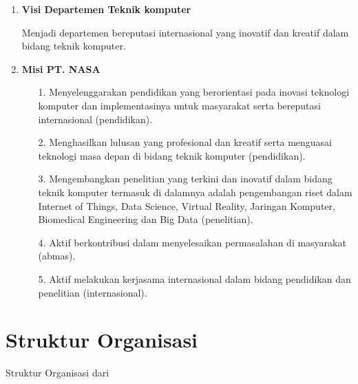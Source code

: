 \begin{enumerate}[nolistsep]

  \item \textbf{Visi Departemen Teknik komputer}

	Menjadi departemen bereputasi internasional yang inovatif dan kreatif dalam bidang teknik komputer.

  \item \textbf{Misi PT. NASA}

  \begin{enumerate}[nolistsep]

    \item [1. ] Menyelenggarakan pendidikan yang berorientasi pada inovasi teknologi komputer dan implementasinya untuk masyarakat serta bereputasi internasional (pendidikan).

    \item [2. ] Menghasilkan lulusan yang profesional dan kreatif serta menguasai teknologi masa depan di bidang teknik komputer (pendidikan).

    \item [3. ] Mengembangkan penelitian yang terkini dan inovatif dalam bidang teknik komputer termasuk di dalamnya adalah pengembangan riset dalam Internet of Things, Data Science, Virtual Reality, Jaringan Komputer, Biomedical Engineering dan Big Data (penelitian).

    \item [4. ] Aktif berkontribusi dalam menyelesaikan permasalahan di masyarakat (abmas).

    \item [5. ] Aktif melakukan kerjasama internasional dalam bidang pendidikan dan penelitian (internasional).
  \end{enumerate}

\end{enumerate}

\section{Struktur Organisasi}

Struktur Organisasi dari \lipsum[14][1-8]

